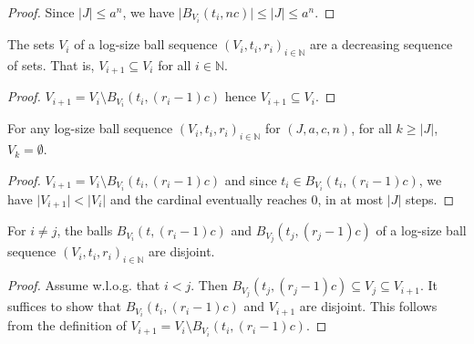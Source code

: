 \begin{proof}
\leanok
Since $|J| \le a^n$, we have $\vert B_{V_i}(t_i, n c) \vert \le \vert J \vert \le a^{n}$.
\end{proof}


\begin{lemma}\label{lem:logSizeBallSequence_V_anti}
  \leanok
The sets $V_i$ of a log-size ball sequence $(V_i, t_i, r_i)_{i \in \mathbb{N}}$ are a decreasing sequence of sets. That is, $V_{i+1} \subseteq V_i$ for all $i \in \mathbb{N}$.
\end{lemma}

\begin{proof}
\leanok
$V_{i+1} = V_i \setminus B_{V_i}(t_i, (r_i - 1)c)$ hence $V_{i+1} \subseteq V_i$.
\end{proof}


\begin{lemma}\label{lem:logSizeBallSequence_eq_zero}
  \leanok
For any log-size ball sequence $(V_i, t_i, r_i)_{i \in \mathbb{N}}$ for $(J, a, c, n)$, for all $k \ge \vert J \vert$, $V_k = \emptyset$.
\end{lemma}

\begin{proof}
  \leanok
$V_{i+1} = V_i \setminus B_{V_i}(t_i, (r_i - 1)c)$ and since $t_i \in B_{V_i}(t_i, (r_i - 1)c)$, we have $\vert V_{i+1} \vert < \vert V_i \vert$ and the cardinal eventually reaches $0$, in at most $\vert J \vert$ steps.
\end{proof}


\begin{lemma}\label{lem:logSizeBallSequence_disjoint_B}
  \leanok
For $i \ne j$, the balls $B_{V_i}(t, (r_i-1)c)$ and $B_{V_j}(t_j, (r_j-1)c)$ of a log-size ball sequence $(V_i, t_i, r_i)_{i \in \mathbb{N}}$ are disjoint.
\end{lemma}

\begin{proof}
  \leanok
Assume w.l.o.g. that $i < j$.
Then $B_{V_j}(t_j, (r_j-1)c) \subseteq V_j \subseteq V_{i+1}$.
It suffices to show that $B_{V_i}(t_i, (r_i-1)c)$ and $V_{i+1}$ are disjoint.
This follows from the definition of $V_{i+1} = V_i \setminus B_{V_i}(t_i, (r_i-1)c)$.
\end{proof}


